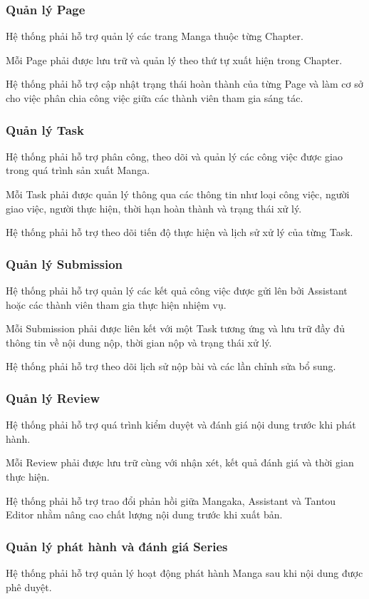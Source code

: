 \documentclass[12pt,a4paper]{article}
\begin{document}
\subsubsection{Quản lý Page}
Hệ thống phải hỗ trợ quản lý các trang Manga thuộc từng Chapter.

Mỗi Page phải được lưu trữ và quản lý theo thứ tự xuất hiện trong Chapter.

Hệ thống phải hỗ trợ cập nhật trạng thái hoàn thành của từng Page và làm cơ sở cho việc phân chia công việc giữa các thành viên tham gia sáng tác.

\subsubsection{Quản lý Task}
Hệ thống phải hỗ trợ phân công, theo dõi và quản lý các công việc được giao trong quá trình sản xuất Manga.

Mỗi Task phải được quản lý thông qua các thông tin như loại công việc, người giao việc, người thực hiện, thời hạn hoàn thành và trạng thái xử lý.

Hệ thống phải hỗ trợ theo dõi tiến độ thực hiện và lịch sử xử lý của từng Task.

\subsubsection{Quản lý Submission}
Hệ thống phải hỗ trợ quản lý các kết quả công việc được gửi lên bởi Assistant hoặc các thành viên tham gia thực hiện nhiệm vụ.

Mỗi Submission phải được liên kết với một Task tương ứng và lưu trữ đầy đủ thông tin về nội dung nộp, thời gian nộp và trạng thái xử lý.

Hệ thống phải hỗ trợ theo dõi lịch sử nộp bài và các lần chỉnh sửa bổ sung.

\subsubsection{Quản lý Review}
Hệ thống phải hỗ trợ quá trình kiểm duyệt và đánh giá nội dung trước khi phát hành.

Mỗi Review phải được lưu trữ cùng với nhận xét, kết quả đánh giá và thời gian thực hiện.

Hệ thống phải hỗ trợ trao đổi phản hồi giữa Mangaka, Assistant và Tantou Editor nhằm nâng cao chất lượng nội dung trước khi xuất bản.

\subsubsection{Quản lý phát hành và đánh giá Series}
Hệ thống phải hỗ trợ quản lý hoạt động phát hành Manga sau khi nội dung được phê duyệt.
\end{document}
